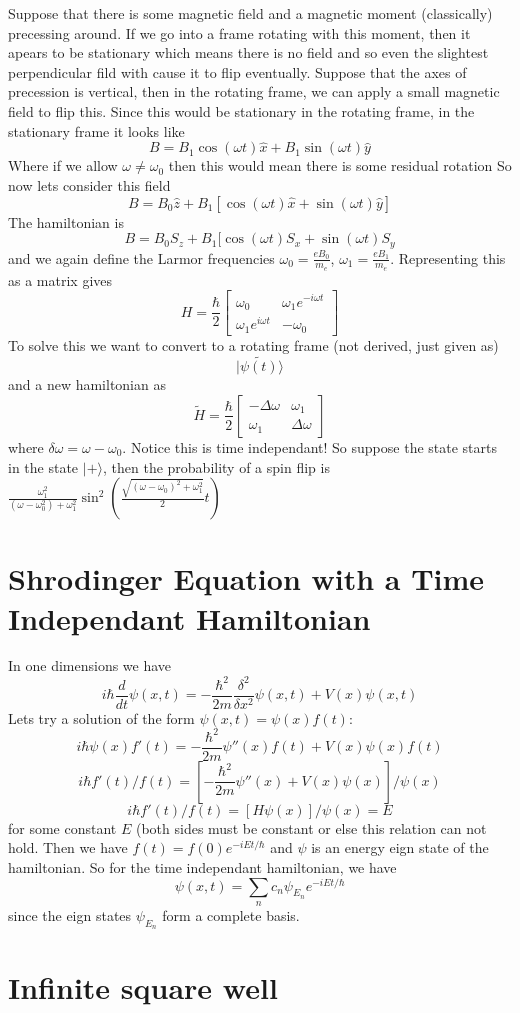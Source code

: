 \documentclass{homework}
\newcommand{\m}[1]{\begin{bmatrix} #1 \end{bmatrix}}
\newcommand{\ket}[1]{| #1 \rangle}
\begin{document}
Suppose that there is some magnetic field and a magnetic moment (classically) precessing around. If we go into a frame rotating with this moment, then it apears to be stationary which means there is no field and so even the slightest perpendicular fild with cause it to flip eventually. Suppose that the axes of precession is vertical, then in the rotating frame, we can apply a small magnetic field to flip this. Since this would be stationary in the rotating frame, in the stationary frame it looks like
\[B = B_1\cos(\omega t)\hat{x} + B_1\sin(\omega t)\hat{y}\]
Where if we allow $\omega \neq \omega_0$ then this would mean there is some residual rotation 
So now lets consider this field
\[B =B_0 \hat{z} + B_1[\cos(\omega t)\hat{x} + \sin(\omega t)\hat{y}]\]
The hamiltonian is
\[B =B_0 S_z + B_1[\cos(\omega t)S_x + \sin(\omega t)S_y\]
and we again define the Larmor frequencies $\omega_0 = \frac{eB_0}{m_e}$, $\omega_1 = \frac{eB_1}{m_e}$. Representing this as a matrix gives
\[H = \frac{\hbar}{2}\m{\omega_0 & \omega_1e^{-i\omega t}\\ \omega_1e^{i\omega t} & -\omega_0}\]
To solve this we want to convert to a rotating frame (not derived, just given as)
\[\ket{\tilde{\psi(t)}} \]
and a new hamiltonian as
\[\tilde{H} = \frac{\hbar}{2}\m{-\Delta \omega & \omega_1 \\\omega_1 & \Delta \omega} \]
where $\delta\omega = \omega  - \omega_0$. Notice this is time independant! So suppose the state starts in the state $\ket{+}$, then the probability of a spin flip is $\frac{\omega_1^2}{(\omega - \omega_0^2) + \omega_1^2}\sin^2(\frac{\sqrt{(\omega - \omega_0)^2 + \omega_1^2}}{2}t)$






\section{Shrodinger Equation with a Time Independant Hamiltonian}

In one dimensions we have
\[i\hbar \frac{d}{dt}\psi(x,t) = -\frac{\hbar^2}{2m}\frac{\delta^2}{\delta x^2}\psi(x,t) + V(x)\psi(x,t)\]
Lets try a solution of the form $\psi(x,t) = \psi(x)f(t)$:
\[i\hbar \psi(x)f'(t) = -\frac{\hbar^2}{2m}\psi''(x)f(t) + V(x)\psi(x)f(t)\]
\[i\hbar f'(t)/f(t) = [-\frac{\hbar^2}{2m}\psi''(x) + V(x)\psi(x)]/\psi(x)\]
\[i\hbar f'(t)/f(t) = [H\psi(x)]/\psi(x) = E\]
for some constant $E$ (both sides must be constant or else this relation can not hold. Then we have $f(t) = f(0)e^{-iEt/\hbar}$ and $\psi$ is an energy eign state of the hamiltonian. So for the time independant hamiltonian, we have
\[\psi(x,t)  = \sum_{n}c_n\psi_{E_n}e^{-iEt/\hbar}\]
since the eign states $\psi_{E_n}$ form a complete basis. 


\section{Infinite square well}
\end{document}
